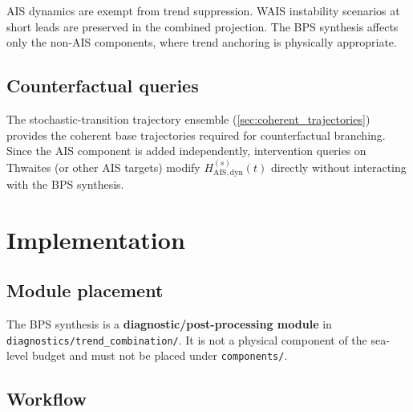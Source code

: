 \documentclass[11pt]{article}
\begin{document}
AIS dynamics are exempt from trend suppression.  WAIS instability scenarios at short leads are preserved in the combined projection.  The BPS synthesis affects only the non-AIS components, where trend anchoring is physically appropriate.

\subsection{Counterfactual queries}

The stochastic-transition trajectory ensemble (\cref{sec:coherent_trajectories}) provides the coherent base trajectories required for counterfactual branching.  Since the AIS component is added independently, intervention queries on Thwaites (or other AIS targets) modify $H_{\mathrm{AIS,dyn}}^{(s)}(t)$ directly without interacting with the BPS synthesis.


\section{Implementation}

\subsection{Module placement}

The BPS synthesis is a \textbf{diagnostic/post-processing module} in \texttt{diagnostics/trend\_combination/}.  It is not a physical component of the sea-level budget and must not be placed under \texttt{components/}.

\subsection{Workflow}
\end{document}
